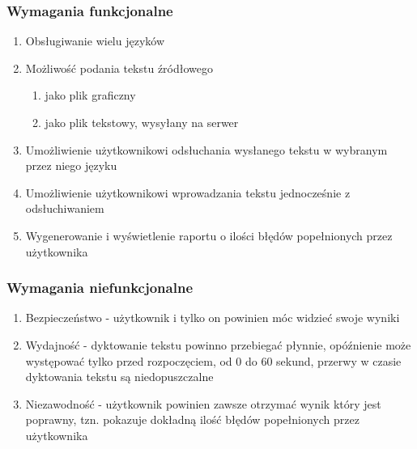 \subsubsection{Wymagania funkcjonalne}
\begin{enumerate}
	\item Obsługiwanie wielu języków
	\item Możliwość podania tekstu źródłowego
		\begin{enumerate}
			\item jako plik graficzny
			\item jako plik tekstowy, wysyłany na serwer
		\end{enumerate}
	\item Umożliwienie użytkownikowi odsłuchania wysłanego tekstu w wybranym przez niego języku
	\item Umożliwienie użytkownikowi wprowadzania tekstu jednocześnie z odsłuchiwaniem
	\item Wygenerowanie i wyświetlenie raportu o ilości błędów popełnionych przez użytkownika
\end{enumerate}

\subsubsection{Wymagania niefunkcjonalne}
\begin{enumerate}
	\item Bezpieczeństwo - użytkownik i tylko on powinien móc widzieć swoje wyniki
	\item Wydajność - dyktowanie tekstu powinno przebiegać płynnie, opóźnienie może występować tylko przed rozpoczęciem, od 0 do 60 sekund, przerwy w czasie dyktowania tekstu są niedopuszczalne
	\item Niezawodność - użytkownik powinien zawsze otrzymać wynik który jest poprawny, tzn. pokazuje dokładną ilość błędów popełnionych przez użytkownika
\end{enumerate}

